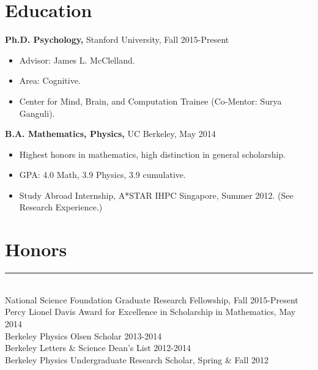 \documentclass[margin]{res}
\begin{document}
 
 
 
\address{{\bf Address} \\ Department of Psychology \\ Stanford University \\ 450 Serra Mall \\ Stanford, CA 94305}
\address{{\bf Contact Information} \\ lampinen@stanford.edu \\\url{web.stanford.edu/~lampinen}}
\begin{resume} 
\section{Education} 
{\bf Ph.D. Psychology,} Stanford University, Fall 2015-Present
\begin{itemize} \itemsep -2pt \item Advisor: James L. McClelland. \item Area: Cognitive. \item Center for Mind, Brain, and Computation Trainee (Co-Mentor: Surya Ganguli).\end{itemize}
{\bf B.A. Mathematics, Physics,} UC Berkeley, May 2014 \begin{itemize} \itemsep -2pt \item Highest honors in mathematics, high distinction in general scholarship. \item GPA: 4.0 Math, 3.9 Physics, 3.9 cumulative. \item Study Abroad Internship, A*STAR IHPC Singapore, Summer 2012. (See Research Experience.) \end{itemize}
\vspace{1pt}\section{Honors} \vspace{-15pt} \rule{\textwidth}{0.5pt} \\[3pt]
National Science Foundation Graduate Research Fellowship, Fall 2015-Present \\
Percy Lionel Davis Award for Excellence in Scholarship in Mathematics, May 2014 \\ 
Berkeley Physics Olsen Scholar 2013-2014 \\
Berkeley Letters \& Science Dean's List 2012-2014\\
Berkeley Physics Undergraduate Research Scholar, Spring \& Fall 2012

\end{resume}
\end{document}
